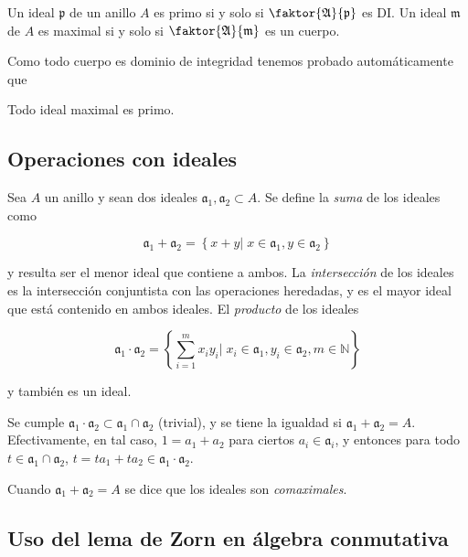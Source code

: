 \documentclass[./main.tex]{subfiles}
\begin{document}
\begin{proposition}
Un ideal $\mathfrak p$ de un anillo $A$ es primo si y solo si $\faktor{\mathfrak A}{ \mathfrak p }$ es DI. Un ideal $\mathfrak m$ de $A$ es maximal si y solo si $\faktor{\mathfrak A}{\mathfrak m}$ es un cuerpo.
\end{proposition}

Como todo cuerpo es dominio de integridad tenemos probado automáticamente que

\begin{corollary}
Todo ideal maximal es primo.
\end{corollary}

\subsection{Operaciones con ideales}
Sea $A$ un anillo y sean dos ideales $\mathfrak a_1, \mathfrak a_2 \subset A$. Se define la \emph{suma} de los ideales como

\[ \mathfrak a_1 + \mathfrak a_2 = \left \{ x+y \big \vert \; x \in \mathfrak a_1, y \in \mathfrak a_2 \right \} \]

y resulta ser el menor ideal que contiene a ambos. La \emph{intersección} de los ideales es la intersección conjuntista con las operaciones heredadas, y es el mayor ideal que está contenido en ambos ideales. El \emph{producto} de los ideales

\[ \mathfrak a_1 \cdot \mathfrak a_2 = \left \{ \sum_{i=1}^m x_iy_i \big \vert \; x_i \in \mathfrak a_1, y_i \in \mathfrak a_2, m\in \mathbb N \right \} \]

y también es un ideal.

\begin{remark}
Se cumple $\mathfrak a_1 \cdot \mathfrak a_2 \subset \mathfrak a_1 \cap \mathfrak a_2$ (trivial), y se tiene la igualdad si $\mathfrak a_1 + \mathfrak a_2 = A$. Efectivamente, en tal caso, $1 = a_1 + a_2$ para ciertos $a_i \in \mathfrak a_i$, y entonces para todo $t\in \mathfrak a_1 \cap \mathfrak a_2$, $t = ta_1 + ta_2 \in \mathfrak a_1 \cdot \mathfrak a_2$.

Cuando $\mathfrak a_1 + \mathfrak a_2 = A$ se dice que los ideales son \emph{comaximales}.
\end{remark}


\subsection{Uso del lema de Zorn en álgebra conmutativa}
\end{document}

